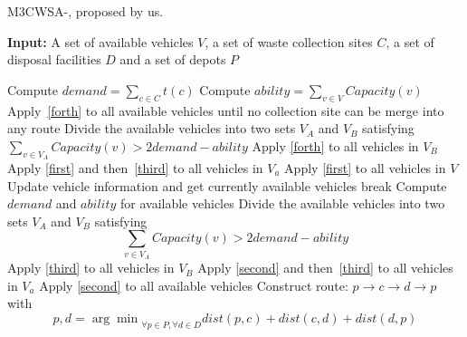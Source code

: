 \documentclass[journal]{IEEEtran}
\begin{document}
\begin{algorithm}[htbp]
	\caption{\label{CWSA1}M3CWSA-\uppercase\expandafter{}, proposed by us.}
	{\bf Input:} A set of available vehicles $V$, a set of waste collection sites $C$, a set of disposal facilities $D$ and a set of depots $P$
	\begin{algorithmic}[1]
		\State Compute $demand= \sum_{c \in C} t(c)$
		\State Compute $ability= \sum_{v \in V} Capacity(v)$
		\State Apply~\ref{forth} to all available vehicles until no collection site can be merge into any route
		\State Divide the available vehicles into two sets $V_A$ and $V_B$ satisfying $\sum_{v \in V_A}{Capacity(v)>}2demand-ability$ 
		\State Apply \ref{forth} to all vehicles in $V_B$
		\State Apply \ref{first} and then~\ref{third} to all vehicles in $V_a$
		\Else
		\State Apply \ref{first} to all vehicles in $V$
		    \State Update vehicle information and get currently available vehicles
		    \State break
		    \EndIf
		    \State Compute $demand$ and $ability$ for available vehicles
    		    \State Divide the available vehicles into two sets $V_A$ and $V_B$ satisfying $$\sum_{v \in V_A}{Capacity(v)>}2demand-ability$$
    		    \State Apply \ref{third} to all vehicles in $V_B$
    		    \State Apply \ref{second} and then~\ref{third} to all vehicles in $V_a$
    		\Else
    			\State Apply \ref{second} to all available vehicles
    		\EndIf
		\EndWhile
		\EndIf
		\State Construct route: $p\rightarrow c \rightarrow d \rightarrow p$ with $$p,d={\arg\min}_{\forall p\in P, \forall d \in D} {dist(p,c)+dist(c,d)+dist(d,p)}$$
		\EndFor
	\end{algorithmic}
\end{algorithm}
\end{document}
